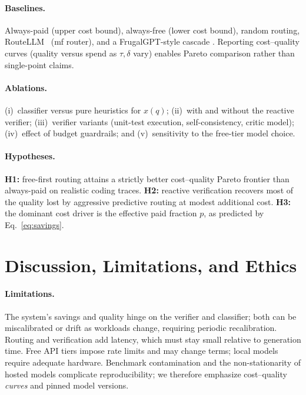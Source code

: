 \documentclass[11pt]{article}
\begin{document}
\paragraph{Baselines.}
Always-paid (upper cost bound), always-free (lower cost bound), random routing,
RouteLLM~\cite{routellm} (mf router), and a FrugalGPT-style cascade
\cite{frugalgpt}. Reporting cost--quality curves (quality versus spend as $\tau,
\delta$ vary) enables Pareto comparison rather than single-point claims.

\paragraph{Ablations.}
(i)~classifier versus pure heuristics for $x(q)$;
(ii)~with and without the reactive verifier;
(iii)~verifier variants (unit-test execution, self-consistency, critic model);
(iv)~effect of budget guardrails; and
(v)~sensitivity to the free-tier model choice.

\paragraph{Hypotheses.}
\textbf{H1:} free-first routing attains a strictly better cost--quality Pareto
frontier than always-paid on realistic coding traces.
\textbf{H2:} reactive verification recovers most of the quality lost by
aggressive predictive routing at modest additional cost.
\textbf{H3:} the dominant cost driver is the effective paid fraction $p$, as
predicted by Eq.~\eqref{eq:savings}.

\section{Discussion, Limitations, and Ethics}
\label{sec:discussion}
\paragraph{Limitations.}
The system's savings and quality hinge on the verifier and classifier; both can
be miscalibrated or drift as workloads change, requiring periodic
recalibration. Routing and verification add latency, which must stay small
relative to generation time. Free API tiers impose rate limits and may change
terms; local models require adequate hardware. Benchmark contamination and the
non-stationarity of hosted models complicate reproducibility; we therefore
emphasize cost--quality \emph{curves} and pinned model versions.
\end{document}
